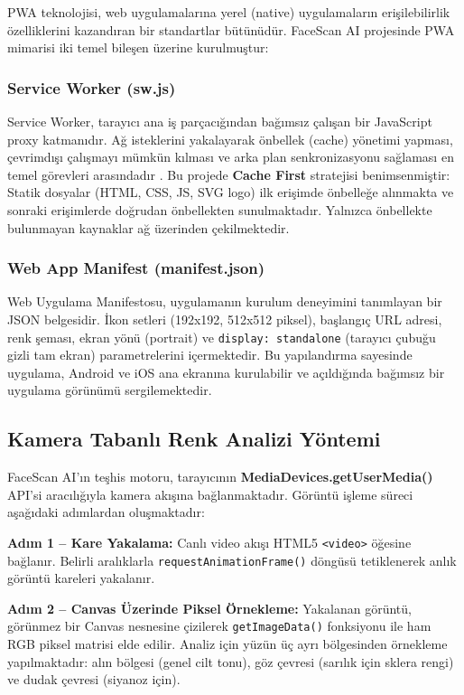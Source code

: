 PWA teknolojisi, web uygulamalarına yerel (native) uygulamaların erişilebilirlik özelliklerini kazandıran bir standartlar bütünüdür. FaceScan AI projesinde PWA mimarisi iki temel bileşen üzerine kurulmuştur:

\subsubsection{Service Worker (sw.js)}
Service Worker, tarayıcı ana iş parçacığından bağımsız çalışan bir JavaScript proxy katmanıdır. Ağ isteklerini yakalayarak önbellek (cache) yönetimi yapması, çevrimdışı çalışmayı mümkün kılması ve arka plan senkronizasyonu sağlaması en temel görevleri arasındadır \cite{biorn2017progressive}. Bu projede \textbf{Cache First} stratejisi benimsenmiştir: Statik dosyalar (HTML, CSS, JS, SVG logo) ilk erişimde önbelleğe alınmakta ve sonraki erişimlerde doğrudan önbellekten sunulmaktadır. Yalnızca önbellekte bulunmayan kaynaklar ağ üzerinden çekilmektedir.

\subsubsection{Web App Manifest (manifest.json)}
Web Uygulama Manifestosu, uygulamanın kurulum deneyimini tanımlayan bir JSON belgesidir. İkon setleri (192x192, 512x512 piksel), başlangıç URL adresi, renk şeması, ekran yönü (portrait) ve \texttt{display: standalone} (tarayıcı çubuğu gizli tam ekran) parametrelerini içermektedir. Bu yapılandırma sayesinde uygulama, Android ve iOS ana ekranına kurulabilir ve açıldığında bağımsız bir uygulama görünümü sergilemektedir.

\subsection{Kamera Tabanlı Renk Analizi Yöntemi}

FaceScan AI'ın teşhis motoru, tarayıcının \textbf{MediaDevices.getUserMedia()} API'si aracılığıyla kamera akışına bağlanmaktadır. Görüntü işleme süreci aşağıdaki adımlardan oluşmaktadır:

\textbf{Adım 1 -- Kare Yakalama:} Canlı video akışı HTML5 \texttt{<video>} öğesine bağlanır. Belirli aralıklarla \texttt{requestAnimationFrame()} döngüsü tetiklenerek anlık görüntü kareleri yakalanır.

\textbf{Adım 2 -- Canvas Üzerinde Piksel Örnekleme:} Yakalanan görüntü, görünmez bir Canvas nesnesine çizilerek \texttt{getImageData()} fonksiyonu ile ham RGB piksel matrisi elde edilir. Analiz için yüzün üç ayrı bölgesinden örnekleme yapılmaktadır: alın bölgesi (genel cilt tonu), göz çevresi (sarılık için sklera rengi) ve dudak çevresi (siyanoz için).

